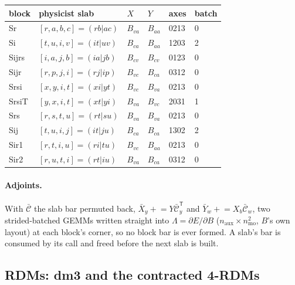 \documentclass[11pt]{article}
\newcommand{\Lb}{\Lambda}
\newcommand{\T}{\mathsf T}
\begin{document}
\begin{center}
\small
\begin{tabular}{@{}llllll@{}}
\toprule
block & physicist slab & $X$ & $Y$ & axes & batch \\
\midrule
Sr    & $[r,a,b,c] = (rb|ac)$ & $B_{va}$ & $B_{aa}$ & 0213 & 0 \\
Si    & $[t,u,i,v] = (it|uv)$ & $B_{ca}$ & $B_{aa}$ & 1203 & 2 \\
Sijrs & $[i,a,j,b] = (ia|jb)$ & $B_{cv}$ & $B_{cv}$ & 0123 & 0 \\
Sijr  & $[r,p,j,i] = (rj|ip)$ & $B_{vc}$ & $B_{ca}$ & 0312 & 0 \\
Srsi  & $[x,y,i,t] = (xi|yt)$ & $B_{vc}$ & $B_{va}$ & 0213 & 0 \\
SrsiT & $[y,x,i,t] = (xt|yi)$ & $B_{va}$ & $B_{vc}$ & 2031 & 1 \\
Srs   & $[r,s,t,u] = (rt|su)$ & $B_{va}$ & $B_{va}$ & 0213 & 0 \\
Sij   & $[t,u,i,j] = (it|ju)$ & $B_{ca}$ & $B_{ca}$ & 1302 & 2 \\
Sir1  & $[r,t,i,u] = (ri|tu)$ & $B_{vc}$ & $B_{aa}$ & 0213 & 0 \\
Sir2  & $[r,u,t,i] = (rt|iu)$ & $B_{va}$ & $B_{ca}$ & 0312 & 0 \\
\bottomrule
\end{tabular}
\end{center}

\paragraph{Adjoints.} With $\bar{\mathcal C}$ the slab bar permuted back,
$\bar X_y \mathrel{+}= Y\bar{\mathcal C}_y^\T$ and $\bar Y_w \mathrel{+}= X_b
\bar{\mathcal C}_w$, two strided-batched GEMMs written straight into
$\Lb = \partial E/\partial B$ ($n_{\mathrm{aux}}\times n_{\mathrm{mo}}^2$,
$B$'s own layout) at each block's corner, so no block bar is ever formed. A
slab's bar is consumed by its call and freed before the next slab is built.

\subsection{RDMs: dm3 and the contracted 4-RDMs}
\label{sec:rdm}
\end{document}
